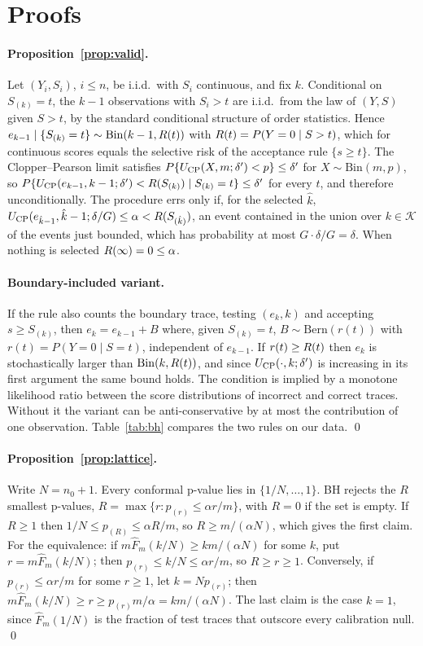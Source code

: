 \section{Proofs}
\label{app:proofs}

\paragraph{Proposition~\ref{prop:valid}.} Let $(Y_i,S_i)$, $i\le n$, be i.i.d.\ with $S_i$ continuous, and fix $k$. Conditional on $S_{(k)}=t$, the $k-1$ observations with $S_i>t$ are i.i.d.\ from the law of $(Y,S)$ given $S>t$, by the standard conditional structure of order statistics. Hence $e_{k-1}\mid\{S_{(k)}=t\}\sim\mathrm{Bin}(k-1,R(t))$ with $R(t)=P(Y=0\mid S>t)$, which for continuous scores equals the selective risk of the acceptance rule $\{s\ge t\}$. The Clopper--Pearson limit satisfies $P\{U_{\mathrm{CP}}(X,m;\delta')<p\}\le\delta'$ for $X\sim\mathrm{Bin}(m,p)$, so $P\{U_{\mathrm{CP}}(e_{k-1},k-1;\delta')<R(S_{(k)})\mid S_{(k)}=t\}\le\delta'$ for every $t$, and therefore unconditionally. The procedure errs only if, for the selected $\hat k$, $U_{\mathrm{CP}}(e_{\hat k-1},\hat k-1;\delta/G)\le\alpha<R(S_{(\hat k)})$, an event contained in the union over $k\in\mathcal K$ of the events just bounded, which has probability at most $G\cdot\delta/G=\delta$. When nothing is selected $R(\infty)=0\le\alpha$.

\paragraph{Boundary-included variant.} If the rule also counts the boundary trace, testing $(e_k,k)$ and accepting $s\ge S_{(k)}$, then $e_k=e_{k-1}+B$ where, given $S_{(k)}=t$, $B\sim\mathrm{Bern}(r(t))$ with $r(t)=P(Y=0\mid S=t)$, independent of $e_{k-1}$. If $r(t)\ge R(t)$ then $e_k$ is stochastically larger than $\mathrm{Bin}(k,R(t))$, and since $U_{\mathrm{CP}}(\cdot,k;\delta')$ is increasing in its first argument the same bound holds. The condition is implied by a monotone likelihood ratio between the score distributions of incorrect and correct traces. Without it the variant can be anti-conservative by at most the contribution of one observation. Table~\ref{tab:bh} compares the two rules on our data. \qed

\paragraph{Proposition~\ref{prop:lattice}.} Write $N=n_0+1$. Every conformal p-value lies in $\{1/N,\dots,1\}$. BH rejects the $R$ smallest p-values, $R=\max\{r:p_{(r)}\le\alpha r/m\}$, with $R=0$ if the set is empty. If $R\ge1$ then $1/N\le p_{(R)}\le\alpha R/m$, so $R\ge m/(\alpha N)$, which gives the first claim. For the equivalence: if $m\hat F_m(k/N)\ge km/(\alpha N)$ for some $k$, put $r=m\hat F_m(k/N)$; then $p_{(r)}\le k/N\le\alpha r/m$, so $R\ge r\ge1$. Conversely, if $p_{(r)}\le\alpha r/m$ for some $r\ge1$, let $k=Np_{(r)}$; then $m\hat F_m(k/N)\ge r\ge p_{(r)}m/\alpha=km/(\alpha N)$. The last claim is the case $k=1$, since $\hat F_m(1/N)$ is the fraction of test traces that outscore every calibration null. \qed

